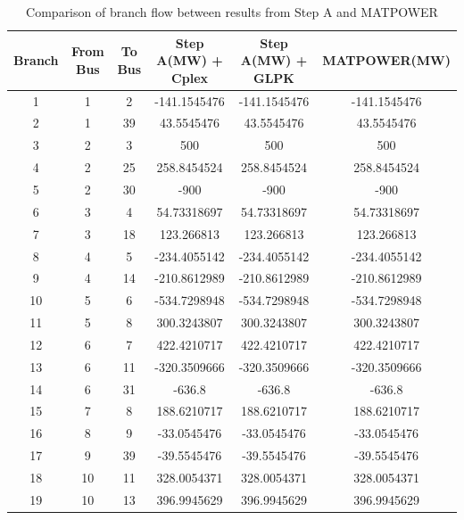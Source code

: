 \documentclass[lettersize,journal]{IEEEtran}
\begin{document}
\begin{table}[htbp]
	\centering
	\caption{Comparison of branch flow between results from Step A and MATPOWER}
	\begin{tabular}{cccccc}
		\toprule
		Branch & From Bus & To Bus & Step A(MW) + Cplex & Step A(MW) + GLPK & \multicolumn{1}{c}{MATPOWER(MW)} \\
		\midrule
		1     & 1     & 2     & -141.1545476 & -141.1545476 & -141.1545476 \\
		\midrule
		2     & 1     & 39    & 43.5545476 & 43.5545476 & 43.5545476 \\
		\midrule
		3     & 2     & 3     & 500   & 500   & 500 \\
		\midrule
		4     & 2     & 25    & 258.8454524 & 258.8454524 & 258.8454524 \\
		\midrule
		5     & 2     & 30    & -900  & -900  & -900 \\
		\midrule
		6     & 3     & 4     & 54.73318697 & 54.73318697 & 54.73318697 \\
		\midrule
		7     & 3     & 18    & 123.266813 & 123.266813 & 123.266813 \\
		\midrule
		8     & 4     & 5     & -234.4055142 & -234.4055142 & -234.4055142 \\
		\midrule
		9     & 4     & 14    & -210.8612989 & -210.8612989 & -210.8612989 \\
		\midrule
		10    & 5     & 6     & -534.7298948 & -534.7298948 & -534.7298948 \\
		\midrule
		11    & 5     & 8     & 300.3243807 & 300.3243807 & 300.3243807 \\
		\midrule
		12    & 6     & 7     & 422.4210717 & 422.4210717 & 422.4210717 \\
		\midrule
		13    & 6     & 11    & -320.3509666 & -320.3509666 & -320.3509666 \\
		\midrule
		14    & 6     & 31    & -636.8 & -636.8 & -636.8 \\
		\midrule
		15    & 7     & 8     & 188.6210717 & 188.6210717 & 188.6210717 \\
		\midrule
		16    & 8     & 9     & -33.0545476 & -33.0545476 & -33.0545476 \\
		\midrule
		17    & 9     & 39    & -39.5545476 & -39.5545476 & -39.5545476 \\
		\midrule
		18    & 10    & 11    & 328.0054371 & 328.0054371 & 328.0054371 \\
		\midrule
		19    & 10    & 13    & 396.9945629 & 396.9945629 & 396.9945629 \\

\end{tabular}
\end{table}
\end{document}
